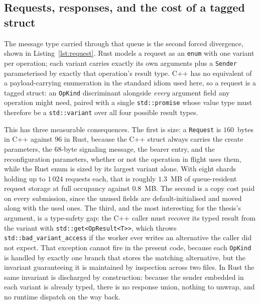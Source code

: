 \documentclass[english,twoside,openright,a4paper,censored,csm,software-track-2020]{HYthesisML}
\begin{document}
\subsection{Requests, responses, and the cost of a tagged struct}\label{sec:tagged}
\label{sec:request}
The message type carried through that queue is the second forced divergence, shown in
Listing~\ref{lst:request}. Rust models a request as an \texttt{enum} with one variant per
operation; each variant carries exactly its own arguments plus a \texttt{Sender} parameterised
by exactly that operation's result type. C++ has no equivalent of a payload-carrying
enumeration in the standard idiom used here, so a request is a tagged struct: an
\texttt{OpKind} discriminant alongside \emph{every} argument field any operation might need,
paired with a single \texttt{std::promise} whose value type must therefore be a
\texttt{std::variant} over all four possible result types.

This has three measurable consequences. The first is size: a \texttt{Request} is $160$~bytes
in C++ against $96$ in Rust, because the C++ struct always carries the create parameters, the
68-byte signaling message, the bearer entry, and the reconfiguration parameters, whether or
not the operation in flight uses them, while the Rust enum is sized by its largest variant
alone. With eight shards holding up to $1\,024$ requests each, that is roughly $1.3$~MB of
queue-resident request storage at full occupancy against $0.8$~MB. The second is a copy cost
paid on every submission, since the unused fields are default-initialised and moved along with
the used ones. The third, and the most interesting for the thesis's argument, is a type-safety
gap: the C++ caller must recover its typed result from the variant with
\texttt{std::get<OpResult<T>>}, which throws \texttt{std::bad\_variant\_access} if the worker
ever writes an alternative the caller did not expect. That exception cannot fire in the
present code, because each \texttt{OpKind} is handled by exactly one branch that stores the
matching alternative, but the invariant guaranteeing it is maintained by inspection across two
files. In Rust the same invariant is discharged by construction: because the sender embedded
in each variant is already typed, there is no response union, nothing to unwrap, and no
runtime dispatch on the way back.
\end{document}
